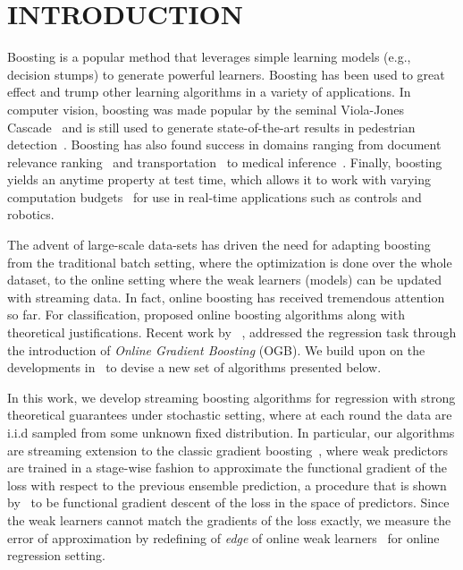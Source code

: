 \section{INTRODUCTION}
Boosting \citep{freund1995desicion} is a popular method that leverages simple learning models (e.g., decision stumps) to generate powerful learners. Boosting has been used to great effect and trump other learning algorithms in a variety of applications. In computer vision, boosting was made popular by the seminal Viola-Jones Cascade~\citep{viola2001rapid} and is still used to generate state-of-the-art results in pedestrian detection~\citep{nam2014local,yang2015convolutional,zhu2016}. Boosting has also found success in domains ranging from document relevance ranking~\citep{yahoo} and transportation~\citep{zhang2015gradient} to medical inference~\citep{atkinson2012assessing}. Finally, boosting yields an anytime property at test time, which allows it to work with varying computation budgets~\citep{grubb2012speedboost} for use in real-time applications such as controls and robotics.

The advent of large-scale data-sets has driven the need for adapting boosting from the traditional batch setting, where the optimization is done over the whole dataset, to the online setting where the weak learners (models) can be updated with streaming data. 
In fact, online boosting has received tremendous attention so far. For classification, \citep{lu:2012,Oza01onlinebagging,beygelzimer2015optimal} proposed online boosting algorithms along with theoretical justifications. Recent work by ~\cite{beygelzimer2015online}, addressed the regression task through the introduction of \emph{Online Gradient Boosting} (OGB). 
We build upon on the developments in~\citep{beygelzimer2015online} to devise a new set of algorithms presented below. 

In this work, we develop streaming boosting algorithms for regression with strong theoretical guarantees under stochastic setting, where at each round the data are i.i.d sampled from some unknown fixed distribution. 
In particular, our algorithms are streaming extension to the classic gradient boosting~\citep{friedman2001greedy}, where weak predictors are trained in a stage-wise fashion to approximate the functional gradient of the loss with respect to the previous ensemble prediction, a procedure that is shown by~\cite{Mason00boostingalgorithms} to be functional gradient descent of the loss in the space of predictors. Since the weak learners cannot match the gradients of the loss exactly, we measure the error of approximation by redefining of \emph{edge} of online weak learners~\citep{beygelzimer2015optimal} for online regression setting. 

